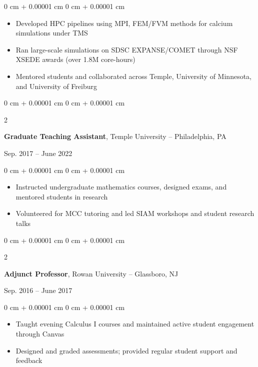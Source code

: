 \documentclass[10pt, letterpaper]{article}
\newenvironment{highlights}{
    \begin{itemize}[
        topsep=0.10 cm,
        parsep=0.10 cm,
        partopsep=0pt,
        itemsep=0pt,
        leftmargin=0 cm + 10pt
    ]
}{
    \end{itemize}
} %
\newenvironment{onecolentry}{
    \begin{adjustwidth}{
        0 cm + 0.00001 cm
    }{
        0 cm + 0.00001 cm
    }
}{
    \end{adjustwidth}
} %
\newenvironment{twocolentry}[2][]{
    \onecolentry
    \def\secondColumn{#2}
    \setcolumnwidth{\fill, 4.5 cm}
    \begin{paracol}{2}
}{
    \switchcolumn \raggedleft \secondColumn
    \end{paracol}
    \endonecolentry
} %
\begin{document}
\vspace{0.10 cm}
\begin{onecolentry}
    \begin{highlights}
        \item Developed HPC pipelines using MPI, FEM/FVM methods for calcium simulations under TMS
        \item Ran large-scale simulations on SDSC EXPANSE/COMET through NSF XSEDE awards (over 1.8M core-hours)
        \item Mentored students and collaborated across Temple, University of Minnesota, and University of Freiburg
    \end{highlights}
\end{onecolentry}

\vspace{0.2 cm}

\begin{twocolentry}{
    Sep. 2017 – June 2022
}
    \textbf{Graduate Teaching Assistant}, Temple University -- Philadelphia, PA
\end{twocolentry}

\vspace{0.10 cm}
\begin{onecolentry}
    \begin{highlights}
        \item Instructed undergraduate mathematics courses, designed exams, and mentored students in research
        \item Volunteered for MCC tutoring and led SIAM workshops and student research talks
    \end{highlights}
\end{onecolentry}

\vspace{0.2 cm}

\begin{twocolentry}{
    Sep. 2016 – June 2017
}
    \textbf{Adjunct Professor}, Rowan University -- Glassboro, NJ
\end{twocolentry}

\vspace{0.10 cm}
\begin{onecolentry}
    \begin{highlights}
        \item Taught evening Calculus I courses and maintained active student engagement through Canvas
        \item Designed and graded assessments; provided regular student support and feedback
    \end{highlights}
\end{onecolentry}
\end{document}
